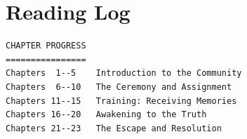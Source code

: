 \section{Reading Log}

\begin{lstlisting}[basicstyle=\ttfamily\small\color{textgray}, backgroundcolor=\color{accent!4}]
CHAPTER PROGRESS
================
Chapters  1--5    Introduction to the Community
Chapters  6--10   The Ceremony and Assignment
Chapters 11--15   Training: Receiving Memories
Chapters 16--20   Awakening to the Truth
Chapters 21--23   The Escape and Resolution
\end{lstlisting}

\vspace{6pt}

